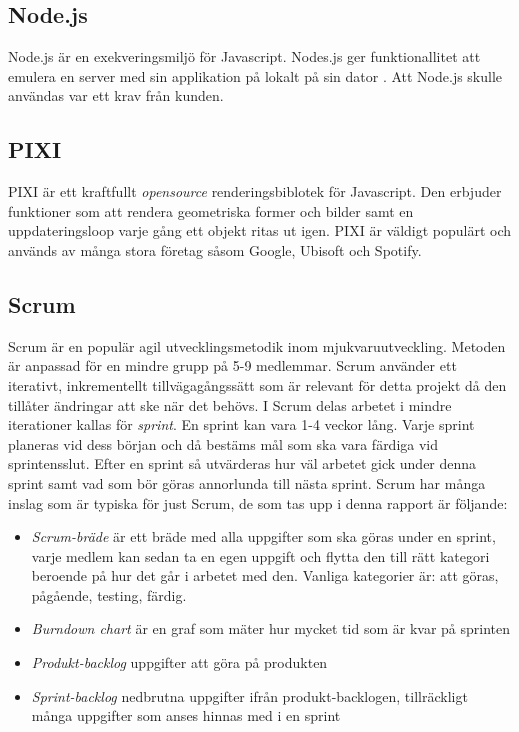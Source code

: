 \subsection*{Node.js}
Node.js är en exekveringsmiljö för Javascript. Nodes.js ger funktionallitet att emulera en server med sin applikation på lokalt på sin dator \cite{Nodejs11:online}. Att Node.js skulle användas var ett krav från kunden.

\subsection*{PIXI}
PIXI är ett kraftfullt \textit{opensource} renderingsbiblotek för Javascript\cite{PixiJSv473:online}. Den erbjuder funktioner som att rendera geometriska former och bilder samt en uppdateringsloop varje gång ett objekt ritas ut igen. PIXI är väldigt populärt och används av många stora företag såsom Google, Ubisoft och Spotify. 

\subsection*{Scrum}
Scrum är en populär agil utvecklingsmetodik inom mjukvaruutveckling. Metoden är anpassad för en mindre grupp på 5-9 medlemmar. Scrum använder ett iterativt, inkrementellt tillvägagångssätt som är relevant för detta projekt då den tillåter ändringar att ske när det behövs\cite{TheScrum81:online}. I Scrum delas arbetet i mindre iterationer kallas för \textit{sprint}. En sprint kan vara 1-4 veckor lång. Varje sprint planeras vid dess början och då bestäms mål som ska vara färdiga vid sprintensslut. Efter en sprint så utvärderas hur väl arbetet gick under denna sprint samt vad som bör göras annorlunda till nästa sprint. Scrum har många inslag som är typiska för just Scrum, de som tas upp i denna rapport är följande:

\begin{itemize}
	\item \textit{Scrum-bräde} är ett bräde med alla uppgifter som ska göras under en sprint, varje medlem kan sedan ta en egen uppgift och flytta den till rätt kategori beroende på hur det går i arbetet med den. Vanliga kategorier är: att göras, pågående, testing, färdig.
	
	\item \textit{Burndown chart} är en graf som mäter hur mycket tid som är kvar på sprinten
	
	\item \textit{Produkt-backlog} uppgifter att göra på produkten
	
	\item \textit{Sprint-backlog} nedbrutna uppgifter ifrån produkt-backlogen, tillräckligt många uppgifter som anses hinnas med i en sprint
	
\end{itemize}

